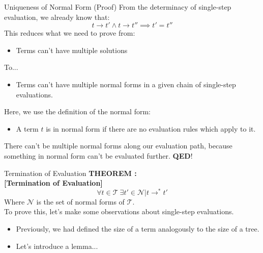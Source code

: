 \documentclass[11pt]{beamer}
\begin{document}
\begin{frame}[fragile=singleslide]{Uniqueness of Normal Form (Proof)}
From the determinacy of single-step evaluation, we already know that:
\begin{equation}
t \rightarrow t' \land t \rightarrow t'' \implies t' = t''
\end{equation}
This reduces what we need to prove from:
\begin{itemize}
\item Terms can't have multiple solutions
\end{itemize}
To...
\begin{itemize}
\item Terms can't have multiple normal forms in a given chain of single-step evaluations.  
\end{itemize}
Here, we use the definition of the normal form:
\begin{itemize}
\item A term $t$ is in normal form if there are no evaluation rules which apply to it.
\end{itemize}
There can't be multiple normal forms along our evaluation path, because something in normal form can't be evaluated further.  \textbf{QED}!
\end{frame}

\begin{frame}[fragile=singleslide]{Termination of Evaluation}
\textbf{THEOREM :} \\
\textbf{[Termination of Evaluation]}  \\
\begin{equation}
\forall t \in \mathcal{T} \: \exists t' \in \mathcal{N} | t \rightarrow^* t'  
\end{equation}
Where $\mathcal{N}$ is the set of normal forms of $\mathcal{T}$.  \\ 
\vspace{1em}
To prove this, let's make some observations about single-step evaluations.  
\begin{itemize}
\item Previously, we had defined the size of a term analogously to the size of a tree.  
\item Let's introduce a lemma... \\
\end{itemize}
\end{frame}
\end{document}
